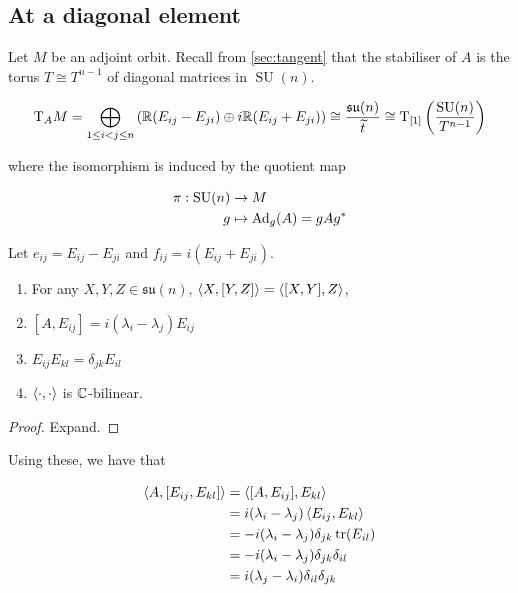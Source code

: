 \documentclass{article}
\DeclareMathOperator{\SU}{SU}
\newcommand{\su}{\mathfrak{su}}
\renewcommand{\tilde}{\widetilde}
\begin{document}
\subsection{At a diagonal element}

Let \(M\) be an adjoint orbit. Recall from \cref{sec:tangent} that the stabiliser of \(A\) is the torus \(T \cong T^{n-1}\) of diagonal matrices in \(\SU(n)\).

\[\T_A M = \bigoplus_{1 \le i < j \le n} \left(\R(E_{ij} - E_{ji}) \oplus i\R (E_{ij} + E_{ji})\right) \cong \frac{\su(n)}{\tilde t} \cong \T_{[1]}\left(\frac{\SU(n)}{T^{n-1}}\right)\]

where the isomorphism is induced by the quotient map

\begin{align*}
    \pi : \SU(n) &\to M \\
    g &\mapsto \Ad_g(A) = gAg^*
\end{align*}

Let \(e_{ij} = E_{ij} - E_{ji}\) and \(f_{ij} = i(E_{ij} + E_{ji})\).

\begin{lemma}
    \begin{enumerate}
        \item For any \(X, Y, Z \in \su(n)\), \(\left\langle X, [Y, Z] \right\rangle = \left\langle [X, Y], Z \right\rangle\),
        \item \([A, E_{ij}] = i(\lambda_i - \lambda_j)E_{ij}\)
        \item \(E_{ij}E_{kl} = \delta_{jk}E_{il}\)
        \item \(\left\langle \cdot, \cdot \right\rangle\) is \(\mathbb{C}\)-bilinear.
    \end{enumerate}
\end{lemma}

\begin{proof}
    Expand.
\end{proof}

Using these, we have that

\begin{align*}
    \left\langle A, [E_{ij}, E_{kl}] \right\rangle &= \left\langle [A, E_{ij}], E_{kl} \right\rangle \\
    &= i(\lambda_i - \lambda_j)\left\langle E_{ij}, E_{kl} \right\rangle \\
    &= -i(\lambda_i - \lambda_j)\delta_{jk}\tr(E_{il}) \\
    &= -i(\lambda_i - \lambda_j)\delta_{jk}\delta_{il} \\
    &= i(\lambda_j - \lambda_i)\delta_{il}\delta_{jk}
\end{align*}
\end{document}
